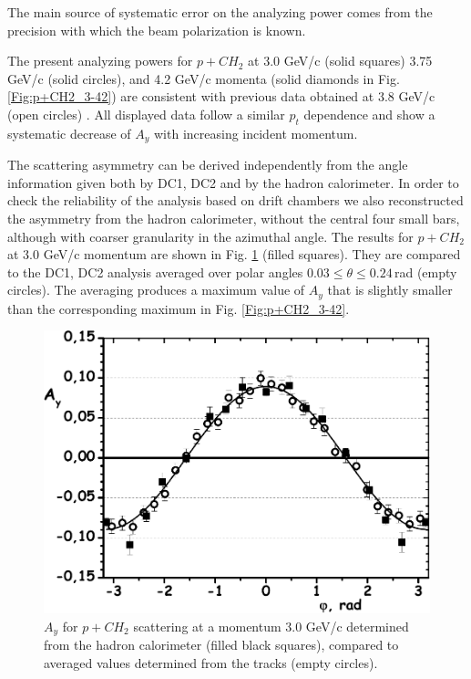 \documentclass[twocolumn,epjc3]{svjour3}
\begin{document}
The main source of systematic error on the analyzing power comes from the precision with which the beam polarization is known.

The present analyzing powers for $p+CH_2$ at 3.0 GeV/c (solid squares) 3.75 GeV/c (solid circles), and 4.2 GeV/c momenta (solid diamonds in Fig. \ref{Fig:p+CH2_3-42}) are consistent with previous data obtained at 3.8 GeV/c (open circles) \cite{Azhgirey:2004yk}. All displayed data follow a similar $p_t$ dependence and show a systematic decrease of $A_y$ with increasing incident momentum.

The scattering asymmetry can be derived independently from the angle information given both by DC1, DC2 and by the hadron calorimeter.  In order to check the reliability of the analysis based on drift chambers we also reconstructed the asymmetry from the hadron calorimeter, without the central four small bars, although with coarser granularity in the azimuthal angle. The results for $p+CH_2$ at 3.0 GeV/c momentum are shown in Fig. \ref{Fig:tracks-hadcal} (filled squares). They are compared to the DC1, DC2 analysis averaged over polar angles $0.03\le \theta\le 0.24$\,rad (empty circles). The averaging produces a maximum value of $A_y$ that is slightly smaller than the corresponding maximum in Fig. \ref{Fig:p+CH2_3-42}.

\begin{figure}
  \centering
  \includegraphics[width=1.00\columnwidth]{fig17_hadcal_asym.pdf}
  \caption{$A_y$ for $p+CH_2$ scattering at a momentum 3.0 GeV/c determined from the hadron calorimeter (filled black squares), compared to averaged values determined from the tracks (empty circles).}
  \label{Fig:tracks-hadcal}
\end{figure}
\end{document}
